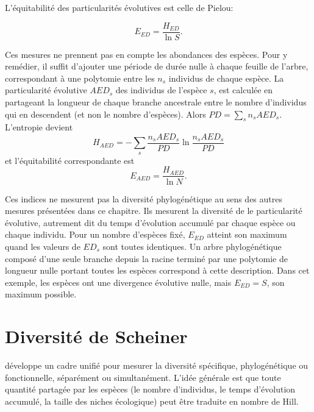 \documentclass[
  11pt,
  french,
  a4paper,
  extrafontsizes,onecolumn,openright
  ]{memoir}
\begin{document}
L'équitabilité des particularités évolutives est celle de Pielou:

\begin{equation}
  \label{eq:EED}
  E_{\mathit{ED}} = \frac{H_{\mathit{ED}}}{\ln{S}}.
\end{equation}

Ces mesures ne prennent pas en compte les abondances des espèces.
Pour y remédier, il suffit d'ajouter une période de durée nulle à chaque feuille de l'arbre, correspondant à une polytomie entre les \(n_s\) individus de chaque espèce.
La particularité évolutive \(\mathit{AED}_s\) des individus de l'espèce \(s\), est calculée en partageant la longueur de chaque branche ancestrale entre le nombre d'individus qui en descendent (et non le nombre d'espèces).
Alors \(\mathit{PD} = \sum_s{n_s \mathit{AED}_s}\).
L'entropie devient
\begin{equation}
  \label{eq:HAED}
  H_{\mathit{AED}} = -\sum_s{\frac{n_s \mathit{AED}_s}{\mathit{PD}} \ln\frac{n_s \mathit{AED}_s}{\mathit{PD}}}
\end{equation}
et l'équitabilité correspondante est
\begin{equation}
  \label{eq:EAED}
  E_{\mathit{AED}} = \frac{H_{\mathit{AED}}}{\ln{N}}.
\end{equation}

Ces indices ne mesurent pas la diversité phylogénétique au sens des autres mesures présentées dans ce chapitre.
Ils mesurent la diversité de le particularité évolutive, autrement dit du temps d'évolution accumulé par chaque espèce ou chaque individu.
Pour un nombre d'espèces fixé, \(E_{\mathit{ED}}\) atteint son maximum quand les valeurs de \(\mathit{ED}_s\) sont toutes identiques.
Un arbre phylogénétique composé d'une seule branche depuis la racine terminé par une polytomie de longueur nulle portant toutes les espèces correspond à cette description.
Dans cet exemple, les espèces ont une divergence évolutive nulle, mais \(E_{\mathit{ED}} = S\), son maximum possible.

\hypertarget{diversituxe9-de-scheiner}{%
\section{Diversité de Scheiner}\label{diversituxe9-de-scheiner}}

\textcite{Scheiner2012} développe un cadre unifié pour mesurer la diversité spécifique, phylogénétique ou fonctionnelle, séparément ou simultanément.
L'idée générale est que toute quantité partagée par les espèces (le nombre d'individus, le temps d'évolution accumulé, la taille des niches écologique) peut être traduite en nombre de Hill.
\end{document}
